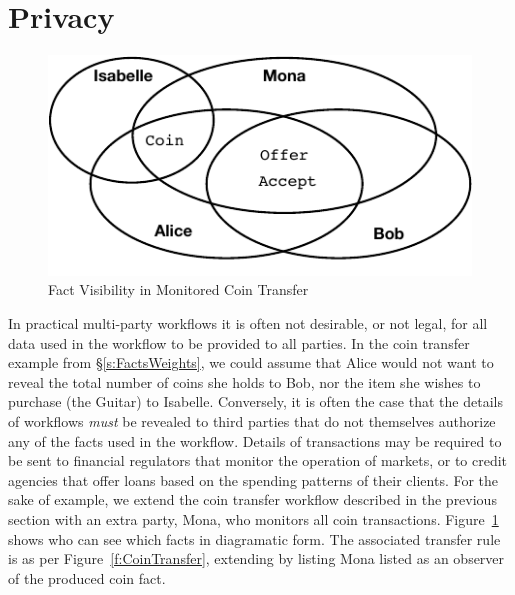 
\section{Privacy}
\label{s:Privacy}

\begin{figure}
\begin{center}
\includegraphics{figure/coin-transfer-visibility.pdf}
\end{center}
\vspace{-2ex}
\caption{Fact Visibility in Monitored Coin Transfer}
\label{f:CoinTransferVisibility}
\end{figure}

In practical multi-party workflows it is often not desirable, or not legal, for all data used in the workflow to be provided to all parties. In the coin transfer example from \S\ref{s:FactsWeights}, we could assume that Alice would not want to reveal the total number of coins she holds to Bob, nor the item she wishes to purchase (the Guitar) to Isabelle. Conversely, it is often the case that the details of workflows \emph{must} be revealed to third parties that do not themselves authorize any of the facts used in the workflow. Details of transactions may be required to be sent to financial regulators that monitor the operation of markets, or to credit agencies that offer loans based on the spending patterns of their clients. For the sake of example, we extend the coin transfer workflow described in the previous section with an extra party, Mona, who monitors all coin transactions. Figure~\ref{f:CoinTransferVisibility} shows who can see which facts in diagramatic form. The associated transfer rule is as per Figure~\ref{f:CoinTransfer}, extending by listing Mona listed as an observer of the produced coin fact.



